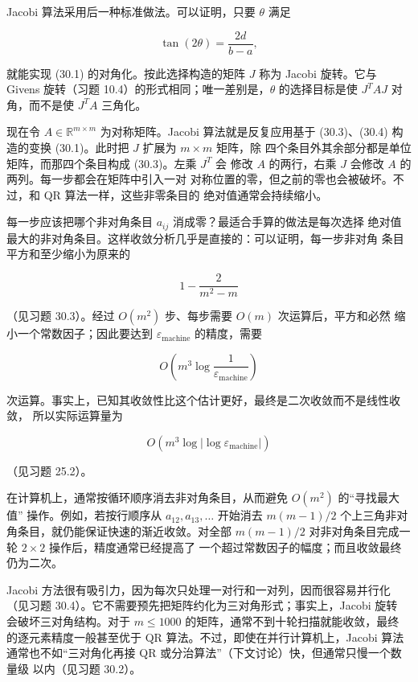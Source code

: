 \documentclass[UTF8,fontset=none,12pt]{ctexart}
\begin{document}
Jacobi 算法采用后一种标准做法。可以证明，只要 $\theta$ 满足

\begin{equation}
\tan(2\theta)=\frac{2d}{b-a},
\tag{30.4}
\end{equation}

就能实现 (30.1) 的对角化。按此选择构造的矩阵 $J$ 称为 Jacobi 旋转。它与
Givens 旋转（习题 10.4）的形式相同；唯一差别是，$\theta$ 的选择目标是使
$J^TAJ$ 对角，而不是使 $J^TA$ 三角化。

现在令 $A\in\mathbb{R}^{m\times m}$ 为对称矩阵。Jacobi 算法就是反复应用基于
(30.3)、(30.4) 构造的变换 (30.1)。此时把 $J$ 扩展为 $m\times m$ 矩阵，除
四个条目外其余部分都是单位矩阵，而那四个条目构成 (30.3)。左乘 $J^T$ 会
修改 $A$ 的两行，右乘 $J$ 会修改 $A$ 的两列。每一步都会在矩阵中引入一对
对称位置的零，但之前的零也会被破坏。不过，和 QR 算法一样，这些非零条目的
绝对值通常会持续缩小。

每一步应该把哪个非对角条目 $a_{ij}$ 消成零？最适合手算的做法是每次选择
绝对值最大的非对角条目。这样收敛分析几乎是直接的：可以证明，每一步非对角
条目平方和至少缩小为原来的

$$
1-\frac{2}{m^2-m}
$$

（见习题 30.3）。经过 $O(m^2)$ 步、每步需要 $O(m)$ 次运算后，平方和必然
缩小一个常数因子；因此要达到 $\varepsilon_{\mathrm{machine}}$ 的精度，需要

$$
O\!\left(m^3\log\frac{1}{\varepsilon_{\mathrm{machine}}}\right)
$$

次运算。事实上，已知其收敛性比这个估计更好，最终是二次收敛而不是线性收敛，
所以实际运算量为

$$
O\!\left(m^3\log\left|\log\varepsilon_{\mathrm{machine}}\right|\right)
$$

（见习题 25.2）。

在计算机上，通常按循环顺序消去非对角条目，从而避免 $O(m^2)$ 的“寻找最大值”
操作。例如，若按行顺序从 $a_{12},a_{13},\ldots$ 开始消去
$m(m-1)/2$ 个上三角非对角条目，就仍能保证快速的渐近收敛。对全部
$m(m-1)/2$ 对非对角条目完成一轮 $2\times2$ 操作后，精度通常已经提高了
一个超过常数因子的幅度；而且收敛最终仍为二次。

Jacobi 方法很有吸引力，因为每次只处理一对行和一对列，因而很容易并行化
（见习题 30.4）。它不需要预先把矩阵约化为三对角形式；事实上，Jacobi 旋转
会破坏三对角结构。对于 $m\le1000$ 的矩阵，通常不到十轮扫描就能收敛，最终
的逐元素精度一般甚至优于 QR 算法。不过，即使在并行计算机上，Jacobi 算法
通常也不如“三对角化再接 QR 或分治算法”（下文讨论）快，但通常只慢一个数量级
以内（见习题 30.2）。
\end{document}
